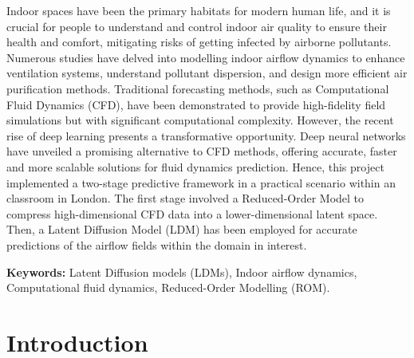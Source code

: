 \documentclass[final-report]{article-template}
\renewenvironment{abstract}{%
    \begin{center}%
        {\bfseries \Large\abstractname\vspace{-0.5em}}%
    \end{center}%
    \quotation
}{%
    \endquotation
}
\begin{document}
\newpage
{}
\setcounter{page}{1}
\begin{abstract}
\noindent Indoor spaces have been the primary habitats for modern human life, and it is crucial for people to understand and control indoor air quality to ensure their health and comfort, mitigating risks of getting infected by airborne pollutants. Numerous studies have delved into modelling indoor airflow dynamics to enhance ventilation systems, understand pollutant dispersion, and design more efficient air purification methods. Traditional forecasting methods, such as Computational Fluid Dynamics (CFD), have been demonstrated to provide high-fidelity field simulations but with significant computational complexity. However, the recent rise of deep learning presents a transformative opportunity. Deep neural networks have unveiled a promising alternative to CFD methods, offering accurate, faster and more scalable solutions for fluid dynamics prediction. Hence, this project implemented a two-stage predictive framework in a practical scenario within an classroom in London. The first stage involved a Reduced-Order Model to compress high-dimensional CFD data into a lower-dimensional latent space. Then, a Latent Diffusion Model (LDM) has been employed for accurate predictions of the airflow fields within the domain in interest.

\noindent \textbf{Keywords:} Latent Diffusion models (LDMs), Indoor airflow dynamics, Computational fluid dynamics, Reduced-Order Modelling (ROM).
\end{abstract}

\setcounter{page}{1}
\section{Introduction}\label{intro}
\end{document}
